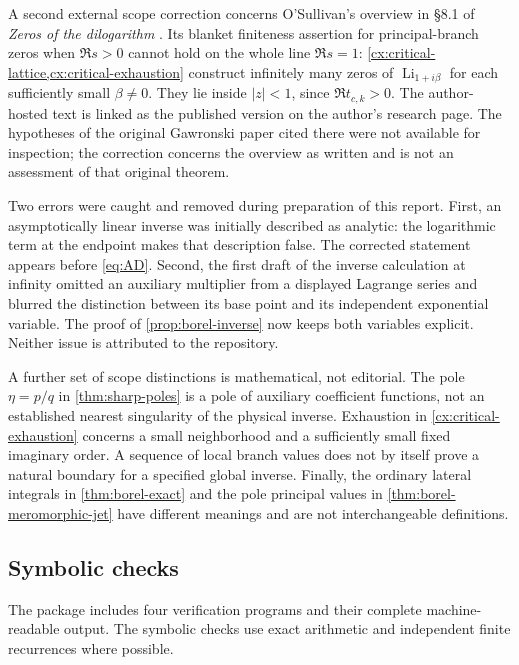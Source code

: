 \documentclass[11pt,a4paper]{article}
\numberwithin{equation}{section}
\theoremstyle{definition}
\theoremstyle{remark}
\DeclareMathOperator{\Li}{Li}
\begin{document}
A second external scope correction concerns O'Sullivan's overview
in \S8.1 of \emph{Zeros of the dilogarithm}
\cite{osullivan}. Its blanket finiteness assertion for principal-branch
zeros when $\Re s>0$ cannot hold on the whole line $\Re s=1$:
\cref{cx:critical-lattice,cx:critical-exhaustion} construct infinitely
many zeros of $\Li_{1+i\beta}$ for each sufficiently small
$\beta\ne0$. They lie inside $|z|<1$, since $\Re t_{c,k}>0$.
The author-hosted text is linked as the published version on the
author's research page. The hypotheses of the original Gawronski
paper cited there \cite{gawronski} were not available for inspection;
the correction concerns the overview as written and is not an
assessment of that original theorem.

Two errors were caught and removed during preparation of this report.
First, an asymptotically linear inverse was initially described as
analytic: the logarithmic term at the endpoint makes that description
false. The corrected statement appears before \eqref{eq:AD}.
Second, the first draft of the inverse calculation at infinity omitted
an auxiliary multiplier from a displayed Lagrange series and blurred
the distinction between its base point and its independent exponential
variable. The proof of \cref{prop:borel-inverse} now keeps both
variables explicit. Neither issue is attributed to the repository.

A further set of scope distinctions is mathematical, not editorial.
The pole $\eta=p/q$ in \cref{thm:sharp-poles} is a pole of auxiliary
coefficient functions, not an established nearest singularity of
the physical inverse. Exhaustion in \cref{cx:critical-exhaustion}
concerns a small neighborhood and a sufficiently small fixed
imaginary order. A sequence of local branch values does not by
itself prove a natural boundary for a specified global inverse.
Finally, the ordinary lateral integrals in \cref{thm:borel-exact}
and the pole principal values in \cref{thm:borel-meromorphic-jet}
have different meanings and are not interchangeable definitions.

\subsection{Symbolic checks}

The package includes four verification programs and their complete
machine-readable output. The symbolic checks use exact arithmetic
and independent finite recurrences where possible.
\end{document}
